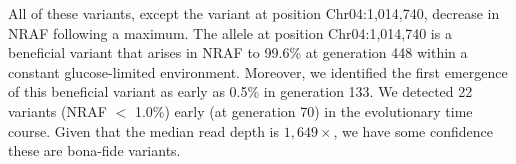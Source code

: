 \documentclass{bmcart}
\begin{document}



All of these variants, except the variant at position Chr04:1,014,740, decrease in NRAF following a maximum.
The allele at position Chr04:1,014,740 is a beneficial variant that arises in NRAF to 99.6\% at generation 448 within a constant glucose-limited environment.
Moreover, we identified the first emergence of this beneficial variant as early as 0.5\% in generation 133.
We detected 22 variants (NRAF $<$ 1.0\%) early (at generation 70) in the evolutionary time course.
Given that the median read depth is $1,649\times$, we have some confidence these are bona-fide variants.

\end{document}
